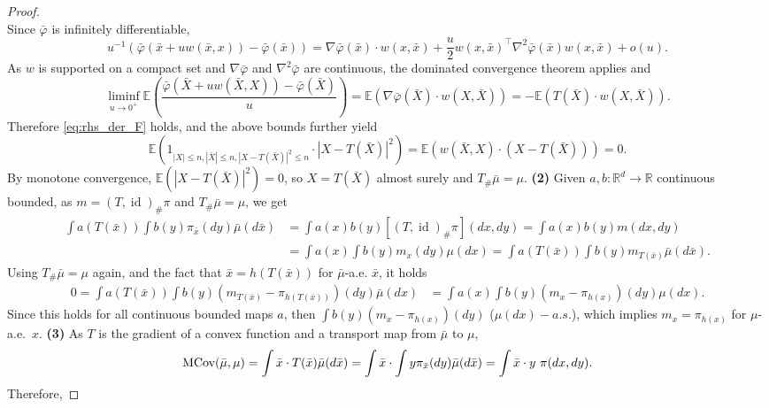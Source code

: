 \documentclass[reqno, a4paper]{amsart}
\DeclareMathOperator{\id}{id}
\theoremstyle{plain}
\theoremstyle{definition}
\theoremstyle{remark}
\numberwithin{equation}{section}
\numberwithin{theorem}{section}
\newcommand{\R}{\mathbb{R}}
\newcommand{\E}{\mathbb{E}}
\newcommand{\MCov}{\textnormal{MCov}}
\begin{document}
\begin{proof}
\begin{equation*}
		\end{equation*}
		Since $\bar\varphi$ is infinitely differentiable, $$  u^{-1}(\bar\varphi(\bar x+uw(\bar x,x))-\bar\varphi(\bar x))= \nabla \bar\varphi (\bar x) \cdot w(x,\bar x) + \frac{u}{2} w(x,\bar x)^\top \nabla^2 \bar\varphi(\bar x) w(x,\bar x) + o(u).$$ As $w$ is supported on a compact set and $\nabla \bar\varphi$ and $\nabla^2 \bar\varphi$ are continuous, the  dominated convergence theorem applies and
		$$ \liminf_{u\to 0^+} \E\left( \frac{\bar\varphi(\bar X+uw(\bar X,X))-\bar\varphi(\bar X)}{u}\right) = \E(\nabla \bar\varphi (\bar X) \cdot w(X,\bar X))= -\E(T(\bar X)\cdot w(X,\bar X)).$$ Therefore \eqref{eq:rhs_der_F} holds, %
		and the above bounds further yield $$\E\left(1_{|X|\leq n, |\bar X | \leq n, |X-T(\bar X)|^2 \leq n}\cdot |X - T(\bar X)|^2\right)=\E\left(w(\bar X,X)\cdot (X - T(\bar X))\right) = 0.$$ By monotone convergence, $\E(|X-T(\bar X)|^2) = 0$, so $X = T(\bar X)$ almost surely and $T_\# \bar \mu = \mu$.
		\newline
		\textbf{(2)} Given $a,b :\R^d \to \R$ continuous bounded, as $m = (T,\id)_\# \pi$ and $T_\# \bar \mu = \mu$, we get 
		\begin{align*}
			\int a(T(\bar x))\int b(y) \pi_{\bar x}(d y) \bar \mu(d\bar x) &= \int a(x) b(y) [(T,\id)_\#\pi](dx,dy)
			= \int a(x) b(y) m(dx,dy)\\
			&= \int a(x) \int b(y) m_x(dy) \mu(dx)
			= \int a(T(\bar x)) \int b(y) m_{T(\bar x)} \bar\mu(d \bar x). 
		\end{align*}
		Using $T_\# \bar \mu = \mu$ again, and the fact that $\bar x = h(T (\bar x))$ for $\bar \mu$-a.e. $\bar x$, it holds
		\begin{align*}
			0 = \int a(T(\bar x)) \int b(y) (m_{T(\bar x)}-\pi_{h(T(\bar x))})(d y) \bar \mu(dx)
			&=  \int a(x) \int b(y) (m_{x}- \pi_{h(x)})(d y)  \mu(dx).
		\end{align*}
		Since this holds for all continuous bounded maps $a$, then 
		$\int b(y) (m_{x}- \pi_{h(x)})(d y)$ ($\mu(dx)-a.s.$),  
		which implies $m_x = \pi_{h(x)}$ for $\mu$-a.e.\ $x$.
		\newline
		\textbf{(3)} As $T$ is the gradient of a convex function and a transport map from $\bar \mu$ to $\mu$, $$\MCov(\bar \mu,\mu) = \int \bar x \cdot T(\bar x) \bar \mu( d \bar x) = \int \bar x \cdot \int y \pi_{\bar x}(dy) \bar \mu(d \bar x) = \int \bar x \cdot y \  \pi(dx,dy).$$ Therefore,

\end{proof}
\end{document}
